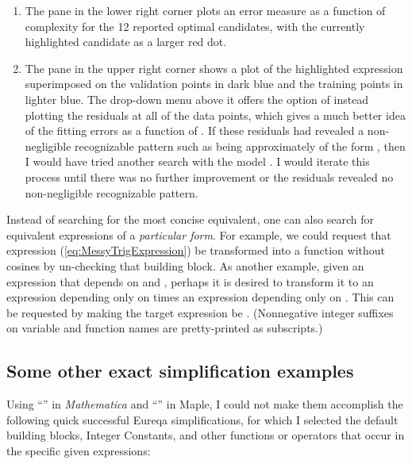 \documentclass[12pt,english]{article}
\begin{document}
\begin{enumerate}
\begin{enumerate}
\item The pane in the lower right corner plots an error measure as a function
of complexity for the 12 reported optimal candidates, with the currently
highlighted candidate as a larger red dot.\vspace{-5pt}

\item The pane in the upper right corner shows a plot of the highlighted
expression superimposed on the validation points in dark blue and
the training points in lighter blue. The drop-down menu above it offers
the option of instead plotting the residuals at all of the data points,
which gives a much better idea of the fitting errors as a function
of . If these residuals had revealed a non-negligible recognizable
pattern such as being approximately of the form , then
I would have tried another search with the model .
I would iterate this process until there was no further improvement
or the residuals revealed no non-negligible recognizable pattern.\vspace{-5pt}

\end{enumerate}
\end{enumerate}
Instead of searching for the most concise equivalent, one can also
search for equivalent expressions of a \textsl{particular form}. For
example, we could request that expression (\ref{eq:MessyTrigExpression})
be transformed into a function without cosines by un-checking that
building block. As another example, given an expression 
that depends on  and , perhaps it is desired to transform
it to an expression depending only on  times an expression depending
only on . This can be requested by making the target expression
be . (Nonnegative integer suffixes on variable
and function names are pretty-printed as subscripts.)


\subsection{Some other exact simplification examples}

Using {}``''
in \textsl{Mathematica} and {}``''
in Maple, I could not make them accomplish the following quick successful
Eureqa simplifications, for which I selected the default building
blocks,\textsf{ Integer Constants}, and other functions or operators
that occur in the specific given expressions:\vspace{-5pt}

\vspace{-5pt}
\end{document}
